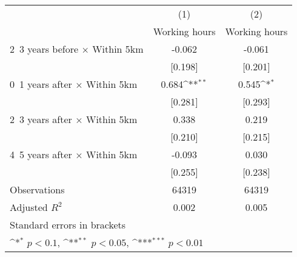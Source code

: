 {
\def\sym#1{\ifmmode^{#1}\else\(^{#1}\)\fi}
\begin{tabular}{l*{2}{c}}
\hline\hline
                    &\multicolumn{1}{c}{(1)}&\multicolumn{1}{c}{(2)}\\
                    &\multicolumn{1}{c}{Working hours}&\multicolumn{1}{c}{Working hours}\\
\hline
2~3 years before × Within 5km&      -0.062         &      -0.061         \\
                    &     [0.198]         &     [0.201]         \\
0~1 years after × Within 5km&       0.684\sym{**} &       0.545\sym{*}  \\
                    &     [0.281]         &     [0.293]         \\
2~3 years after × Within 5km&       0.338         &       0.219         \\
                    &     [0.210]         &     [0.215]         \\
4~5 years after × Within 5km&      -0.093         &       0.030         \\
                    &     [0.255]         &     [0.238]         \\
\hline
Observations        &       64319         &       64319         \\
Adjusted \(R^{2}\)  &       0.002         &       0.005         \\
\hline\hline
\multicolumn{3}{l}{\footnotesize Standard errors in brackets}\\
\multicolumn{3}{l}{\footnotesize \sym{*} \(p<0.1\), \sym{**} \(p<0.05\), \sym{***} \(p<0.01\)}\\
\end{tabular}
}
